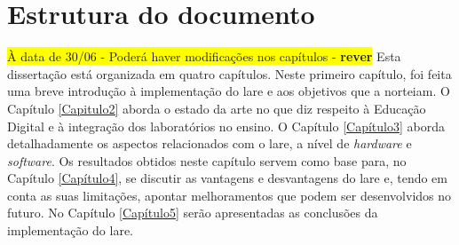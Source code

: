 \section{Estrutura do documento}
\textbf{\textcolor{red}{}}
\colorbox{yellow}{À data de 30/06 - Poderá haver modificações nos capítulos - \textbf{ rever}}
Esta dissertação está organizada em quatro capítulos. Neste primeiro capítulo, foi feita uma breve introdução à implementação do \acrshort{lare} e aos objetivos que a norteiam. O Capítulo \ref{Capitulo2} aborda o estado da arte no que diz respeito à Educação Digital e à integração dos laboratórios no ensino. O Capítulo \ref{Capítulo3} aborda detalhadamente os aspectos relacionados com o \acrshort{lare}, a nível de \textit{hardware} e \textit{software}. Os resultados obtidos neste capítulo servem como base para, no Capítulo \ref{Capítulo4}, se discutir as vantagens e desvantagens do \acrshort{lare} e, tendo em conta as suas limitações, apontar melhoramentos que podem ser desenvolvidos no futuro.  No Capítulo \ref{Capítulo5} serão apresentadas as conclusões da implementação do \acrshort{lare}.

